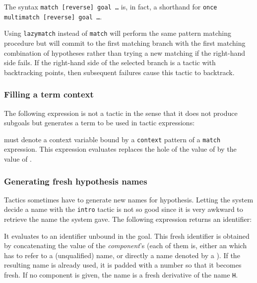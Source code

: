 The syntax {\tt match [reverse] goal \ldots} is, in fact, a shorthand for
{\tt once multimatch [reverse] goal \ldots}.

Using {\tt lazymatch} instead of {\tt match} will perform the same
pattern matching procedure but will commit to the first matching
branch with the first matching combination of hypotheses rather than
trying a new matching if the right-hand side fails. If the right-hand
side of the selected branch is a tactic with backtracking points, then
subsequent failures cause this tactic to backtrack.

\subsubsection[Filling a term context]{Filling a term context}

The following expression is not a tactic in the sense that it does not
produce subgoals but generates a term to be used in tactic
expressions:
\begin{quote}
{}
\end{quote}
{\ident} must denote a context variable bound by a {\tt context}
pattern of a {\tt match} expression. This expression evaluates
replaces the hole of the value of {\ident} by the value of
{\tacexpr}.

\ErrMsg {}


\subsubsection[Generating fresh hypothesis names]{Generating fresh hypothesis names
}

Tactics sometimes have to generate new names for hypothesis. Letting
the system decide a name with the {\tt intro} tactic is not so good
since it is very awkward to retrieve the name the system gave.
The following expression returns an identifier:
\begin{quote}
{}
\end{quote}
It evaluates to an identifier unbound in the goal. This fresh
identifier is obtained by concatenating the value of the
\textrm{\textsl{component}}'s (each of them is, either an {\qualid} which
has to refer to a (unqualified) name, or directly a name denoted by a
{\qstring}). If the resulting name is already used, it is padded
with a number so that it becomes fresh. If no component is
given, the name is a fresh derivative of the name {\tt H}.


